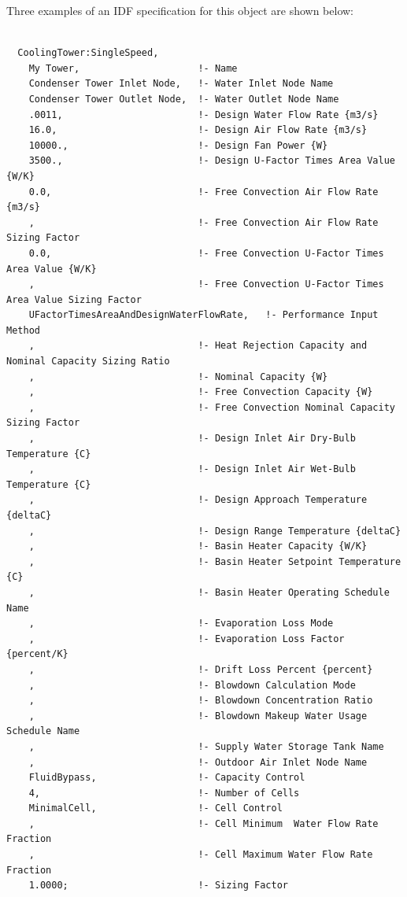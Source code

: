 Three examples of an IDF specification for this object are shown below:

\begin{lstlisting}

  CoolingTower:SingleSpeed,
    My Tower,                     !- Name
    Condenser Tower Inlet Node,   !- Water Inlet Node Name
    Condenser Tower Outlet Node,  !- Water Outlet Node Name
    .0011,                        !- Design Water Flow Rate {m3/s}
    16.0,                         !- Design Air Flow Rate {m3/s}
    10000.,                       !- Design Fan Power {W}
    3500.,                        !- Design U-Factor Times Area Value {W/K}
    0.0,                          !- Free Convection Air Flow Rate {m3/s}
    ,                             !- Free Convection Air Flow Rate Sizing Factor
    0.0,                          !- Free Convection U-Factor Times Area Value {W/K}
    ,                             !- Free Convection U-Factor Times Area Value Sizing Factor
    UFactorTimesAreaAndDesignWaterFlowRate,   !- Performance Input Method
    ,                             !- Heat Rejection Capacity and Nominal Capacity Sizing Ratio
    ,                             !- Nominal Capacity {W}
    ,                             !- Free Convection Capacity {W}
    ,                             !- Free Convection Nominal Capacity Sizing Factor
    ,                             !- Design Inlet Air Dry-Bulb Temperature {C}
    ,                             !- Design Inlet Air Wet-Bulb Temperature {C}
    ,                             !- Design Approach Temperature {deltaC}
    ,                             !- Design Range Temperature {deltaC}
    ,                             !- Basin Heater Capacity {W/K}
    ,                             !- Basin Heater Setpoint Temperature {C}
    ,                             !- Basin Heater Operating Schedule Name
    ,                             !- Evaporation Loss Mode
    ,                             !- Evaporation Loss Factor {percent/K}
    ,                             !- Drift Loss Percent {percent}
    ,                             !- Blowdown Calculation Mode
    ,                             !- Blowdown Concentration Ratio
    ,                             !- Blowdown Makeup Water Usage Schedule Name
    ,                             !- Supply Water Storage Tank Name
    ,                             !- Outdoor Air Inlet Node Name
    FluidBypass,                  !- Capacity Control
    4,                            !- Number of Cells
    MinimalCell,                  !- Cell Control
    ,                             !- Cell Minimum  Water Flow Rate Fraction
    ,                             !- Cell Maximum Water Flow Rate Fraction
    1.0000;                       !- Sizing Factor


\end{lstlisting}

